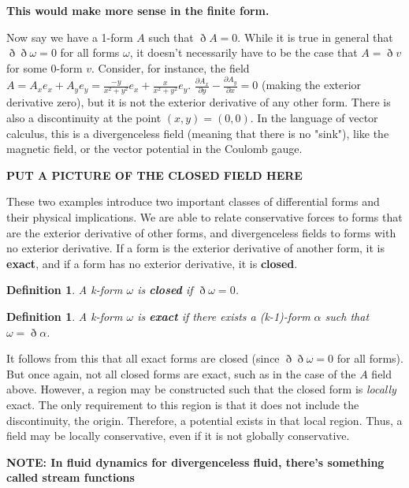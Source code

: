 \documentclass{book}
\newtheorem{defn}[equation]{Definition}
\begin{document}
\textbf{This would make more sense in the finite form.}

Now say we have a 1-form $A$ such that $\eth A = 0.$ While it is true in general that $\eth\eth\omega = 0$ for all forms $\omega$, it doesn't necessarily have to be the case that $A = \eth v$ for some 0-form $v.$ Consider, for instance, the field $A = A_x e_x + A_y e_y = \frac{-y}{x^2 + y^2} e_x + \frac{x}{x^2 + y^2} e_y$. $\frac{\partial A_x}{\partial y} - \frac{\partial A_y}{\partial x} = 0$ (making the exterior derivative zero), but it is not the exterior derivative of any other form. There is also a discontinuity at the point $(x,y) = (0,0)$. In the language of vector calculus, this is a divergenceless field (meaning that there is no "sink"), like the magnetic field, or the vector potential in the Coulomb gauge.  

\textbf{PUT A PICTURE OF THE CLOSED FIELD HERE}

These two examples introduce two important classes of differential forms and their physical implications. We are able to relate conservative forces to forms that are the exterior derivative of other forms, and divergenceless fields to forms with no exterior derivative. If a form is the exterior derivative of another form, it is \textbf{exact}, and if a form has no exterior derivative, it is \textbf{closed}.
 
\begin{defn} 
	A k-form \textbf{$\omega$} is \textbf{closed} if $\eth\omega = 0$. 
\end{defn}

\begin{defn} 
	A k-form \textbf{$\omega$} is \textbf{exact} if there exists a (k-1)-form $\alpha$ such that $\omega = \eth\alpha$.
\end{defn}



It follows from this that all exact forms are closed (since $\eth\eth\omega = 0$ for all forms). But once again, not all closed forms are exact, such as in the case of the $A$ field above. However, a region may be constructed such that the closed form is \emph{locally} exact. The only requirement to this region is that it does not include the discontinuity, the origin. Therefore, a potential exists in that local region. Thus, a field may be locally conservative, even if it is not globally conservative. 




\textbf{NOTE: In fluid dynamics for divergenceless fluid, there's something called stream functions}
\end{document}
